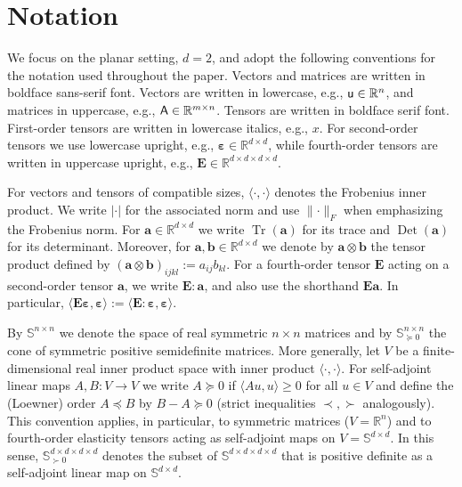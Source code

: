 \documentclass[preprint,3p]{elsarticle}
\newcommand{\tens}[1]{\bm{\mathit{#1}}}             %
\newcommand{\tenss}[1]{\bm{\mathbf{#1}}}            %
\newcommand{\tensf}[1]{\bm{\mathbf{#1}}}            %
\newcommand{\strain}{\tenss{\varepsilon}}           %
\newcommand{\semtrx}[1]{\ifcat\noexpand#1\relax\bm{#1}\else\mathsf{#1}\fi}
\newcommand{\sevek}[1]{\ifcat\noexpand#1\relax\bm{#1}\else\mathsf{#1}\fi}
\newcommand{\Tr}{\operatorname{Tr}}
\newcommand{\Det}{\operatorname{Det}}
\begin{document}
\section{Notation}\label{sec:notation}
We focus on the planar setting, $d=2$, and adopt the following conventions for the notation used throughout the paper. Vectors and matrices are written in boldface sans-serif font. Vectors are written in lowercase, e.g., $\sevek{u}\in\mathbb{R}^n$, and matrices in uppercase, e.g., $\semtrx{A}\in\mathbb{R}^{m\times n}$. Tensors are written in boldface serif font. First-order tensors are written in lowercase italics, e.g., $\tens{x}$. For second-order tensors we use lowercase upright, e.g., $\tenss{\varepsilon}\in\mathbb{R}^{d\times d}$, while fourth-order tensors are written in uppercase upright, e.g., $\tensf{E}\in\mathbb{R}^{d\times d\times d\times d}$.

For vectors and tensors of compatible sizes, $\langle\cdot,\cdot\rangle$ denotes the Frobenius inner product. We write $\lvert\cdot\rvert$ for the associated norm and use $\lVert\cdot\rVert_F$ when emphasizing the Frobenius norm. For $\tenss{a}\in\mathbb{R}^{d\times d}$ we write $\Tr(\tenss{a})$ for its trace and $\Det(\tenss{a})$ for its determinant. Moreover, for $\tenss{a},\tenss{b}\in\mathbb{R}^{d\times d}$ we denote by $\tenss{a}\otimes \tenss{b}$ the tensor product defined by $(\tenss{a}\otimes \tenss{b})_{ijkl}:=a_{ij}b_{kl}$. For a fourth-order tensor $\tensf{E}$ acting on a second-order tensor $\tenss{a}$, we write $\tensf{E}:\tenss{a}$, and also use the shorthand $\tensf{E}\tenss{a}$. In particular, $\langle\tensf{E}\strain,\strain\rangle:=\langle\tensf{E}:\strain,\strain\rangle$.

By $\mathbb{S}^{n\times n}$ we denote the space of real symmetric $n\times n$ matrices and by $\mathbb{S}^{n\times n}_{\succeq 0}$ the cone of symmetric positive semidefinite matrices. More generally, let $V$ be a finite-dimensional real inner product space with inner product $\langle\cdot,\cdot\rangle$. For self-adjoint linear maps $A,B:V\to V$ we write $A\succeq 0$ if $\langle Au,u\rangle\ge 0$ for all $u\in V$ and define the (Loewner) order $A\preceq B$ by $B-A\succeq 0$ (strict inequalities $\prec,\succ$ analogously). This convention applies, in particular, to symmetric matrices ($V=\mathbb{R}^n$) and to fourth-order elasticity tensors acting as self-adjoint maps on $V=\mathbb{S}^{d\times d}$. In this sense, $\mathbb{S}^{d\times d\times d\times d}_{\succ 0}$ denotes the subset of $\mathbb{S}^{d\times d\times d\times d}$ that is positive definite as a self-adjoint linear map on $\mathbb{S}^{d\times d}$.
\end{document}
